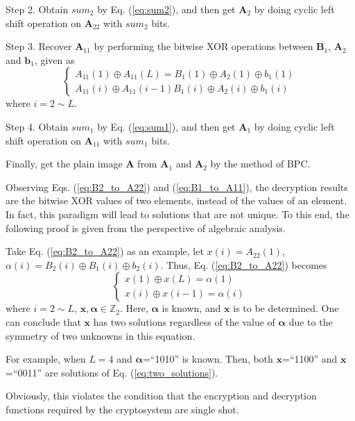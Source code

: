 \documentclass[final,3p,times,twocolumn]{elsarticle}
\begin{document}
\begin{itemize}
	Step 2. Obtain $sum_2$ by Eq. (\ref{eq:sum2}), and then get $\bm{A}_{2}$ by doing cyclic left shift operation on $\bm{A}_{22}$ with $sum_2$ bits.
	
	Step 3. Recover $\bm{A}_{11}$ by performing the bitwise XOR operations between $\bm{B}_{1}$, $\bm{A}_{2}$ and $\bm{b}_{1}$, given as
	\begin{equation}
	\left\{ \begin{array}{l}
	A_{11}(1) \oplus A_{11}(L) = B_1(1) \oplus A_{2}(1) \oplus b_{1}(1)\\
	A_{11}(i) \oplus A_{11}(i-1) B_1(i) \oplus A_{2}(i) \oplus b_{1}(i)
	\end{array} \right.
	\label{eq:B1_to_A11}
	\end{equation}
	where $i=2 \sim L$.
	
	Step 4. Obtain $sum_1$ by Eq. (\ref{eq:sum1}), and then get $\bm{A}_{1}$ by doing cyclic left shift operation on $\bm{A}_{11}$ with $sum_1$ bits.
	
	Finally, get the plain image $\bm{A}$ from $\bm{A}_1$ and $\bm{A}_2$ by the method of BPC.
\end{itemize}

Observing Eqs. (\ref{eq:B2_to_A22}) and (\ref{eq:B1_to_A11}), the decryption results are the bitwise XOR values of two elements, instead of the values of an element. In fact, this paradigm will lead to solutions that are not unique. To this end, the following proof is given from the perspective of algebraic analysis. 

Take Eq. (\ref{eq:B2_to_A22}) as an example, let $x(i)=A_{22}(1)$, $\alpha(i)=B_2(i) \oplus B_{1}(i) \oplus b_{2}(i)$. Thus, Eq. (\ref{eq:B2_to_A22}) becomes
\begin{equation}
\left\{ \begin{array}{l}
x(1) \oplus x(L)  = \alpha(1)\\
x(i) \oplus x(i-1) = \alpha(i)
\end{array} \right.
\label{eq:two_solutions}
\end{equation}
where $i=2 \sim L$, $\bm{x},\bm{\alpha} \in \mathbb{Z}_{2}$. Here, $\bm{\alpha}$ is known, and $\bm{x}$ is to be determined.
One can conclude that $\bm{x}$ has two solutions regardless of the value of $\bm{\alpha}$ due to the symmetry of two unknowns in this equation.

For example, when $L=4$ and $\bm{\alpha}$=``1010'' is known. Then, both $\bm{x}$=``1100'' and $\bm{x}$=``0011'' are solutions of Eq. (\ref{eq:two_solutions}).

Obviously, this violates the condition that the encryption and decryption functions required by the cryptosystem are single shot.
\end{document}
